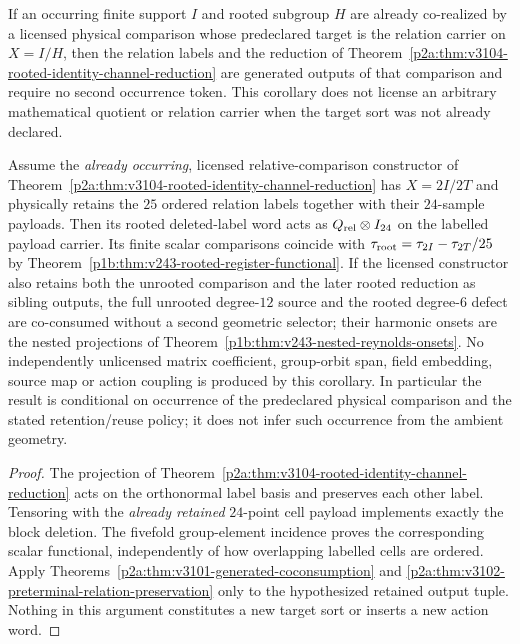 \documentclass[12pt,a4paper]{article}
\begin{document}
\begin{corollary}
\label{p2a:cor:v3104-rooted-relation-corealization}
If an occurring finite support $I$ and rooted subgroup $H$ are already
co-realized by a licensed physical comparison whose predeclared target is the
relation carrier on $X=I/H$, then the relation labels and the reduction of
Theorem~\ref{p2a:thm:v3104-rooted-identity-channel-reduction} are generated
outputs of that comparison and require no second occurrence token.  This
corollary does not license an arbitrary mathematical quotient or relation
carrier when the target sort was not already declared.
\end{corollary}
\begin{corollary}
\label{p2a:cor:v243-one-root-register-descent}
Assume the \emph{already occurring}, licensed relative-comparison
constructor of
Theorem~\ref{p2a:thm:v3104-rooted-identity-channel-reduction}
has $X=2I/2T$ and physically retains the $25$ ordered relation
labels together with their $24$-sample payloads.  Then its rooted
deleted-label word acts as $Q_{\rm rel}\otimes I_{24}$ on the
labelled payload carrier.  Its finite scalar comparisons coincide with
$\tau_{\rm root}=\tau_{2I}-\tau_{2T}/25$ by
Theorem~\ref{p1b:thm:v243-rooted-register-functional}.
If the licensed constructor also retains both the unrooted comparison
and the later rooted reduction as sibling outputs, the full
unrooted degree-$12$ source and the rooted degree-$6$ defect are
co-consumed without a second geometric selector; their harmonic
onsets are the nested projections of
Theorem~\ref{p1b:thm:v243-nested-reynolds-onsets}.
No independently unlicensed matrix coefficient, group-orbit span,
field embedding, source map or action coupling is produced by this
corollary.  In particular the result is conditional on occurrence of
the predeclared physical comparison and the stated retention/reuse
policy; it does not infer such occurrence from the ambient geometry.
\end{corollary}
\begin{proof}
The projection of Theorem~\ref{p2a:thm:v3104-rooted-identity-channel-reduction}
acts on the orthonormal label basis and preserves each other label.
Tensoring with the \emph{already retained} $24$-point cell payload
implements exactly the block deletion.  The fivefold group-element
incidence proves the corresponding scalar functional, independently
of how overlapping labelled cells are ordered.  Apply
Theorems~\ref{p2a:thm:v3101-generated-coconsumption} and
\ref{p2a:thm:v3102-preterminal-relation-preservation} only to the
hypothesized retained output tuple.  Nothing in this argument
constitutes a new target sort or inserts a new action word.
\end{proof}
\end{document}
